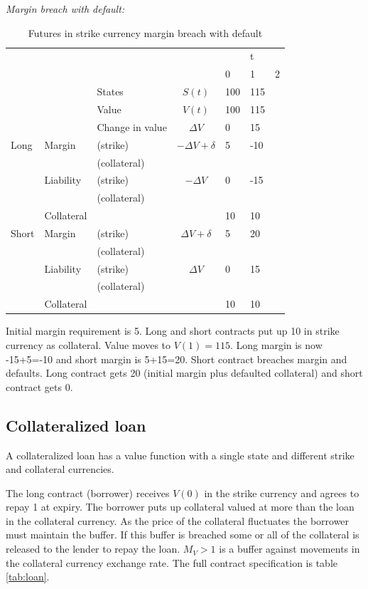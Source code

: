 \documentclass[12pt]{article}
\begin{document}
\textit{Margin breach with default:}
\begin{table}
\begin{tabular}{lll|c|lll}
&  &  &  &  & t &\\  
&  &  &  & 0 & 1 & 2\\
\hline
\hline
&  & States &  $S(t)$ & 100 & 115 & \\
&  & Value  &  $V(t)$  & 100 & 115 &  \\
&  & Change in value & $\Delta V$ & 0& 15 &  \\
\hline
Long      & Margin    & (strike)     & $-\Delta V + \delta$ & 5 & -10 & \\
          &           & (collateral) & & & &\\ 
          & Liability & (strike)     & $-\Delta V$ & 0 & -15 & \\ 
          &           & (collateral)& & & &\\
          & Collateral&                       &    & 10 & 10 & \\
\hline          
Short     & Margin    & (strike)     & $\Delta V + \delta$ & 5 & 20 & \\
          &           & (collateral) & & & &\\
          & Liability & (strike)     & $\Delta V$ & 0 & 15 &\\
          &           & (collateral) & & & &\\
          & Collateral&                       &    & 10 & 10 & \\ 
          

\end{tabular}
\caption{Futures in strike currency margin breach with default}
\label{fut}
\end{table}

Initial margin requirement is 5. Long and short contracts put up 10 in strike currency as collateral. Value moves to $V(1) = 115$. Long margin is now -15+5=-10 and short margin is 5+15=20. Short contract breaches margin and defaults. Long contract gets 20 (initial margin plus defaulted collateral) and short contract gets 0. 

\subsection{Collateralized loan}

A collateralized loan has a value function with a single state and different strike and collateral currencies. 

The long contract (borrower) receives $V(0)$ in the strike currency and agrees to repay 1 at expiry. The borrower puts up collateral valued at more than the loan in the collateral currency. As the price of the collateral fluctuates the borrower must maintain the buffer. If this buffer is breached some or all of the collateral is released to the lender to repay the loan. $M_V>1$ is a buffer against movements in the collateral currency exchange rate. The full contract specification is table \ref{tab:loan}.
\end{document}
